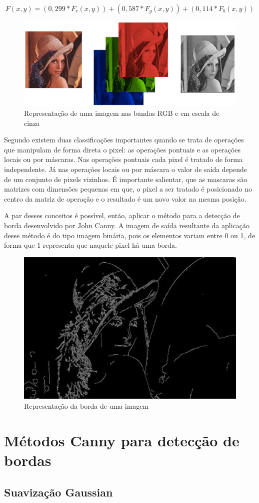 \documentclass[a4paper,alpha-refs]{RBCA_v1.0}
\begin{document}
\begin{equation}
F(x,y)=(0,299*F_r(x,y))+(0,587*F_g(x,y))+(0,114*F_b(x,y))
\end{equation} 


\begin{figure}[h!]
	\centering
	\includegraphics[width=.5\textwidth]{img/lenna_rgb_gray.jpg}
	\caption{Representação de uma imagem nas bandas RGB e em escala de cinza}
	\label{img:lenargb}
\end{figure}

Segundo \cite{de2006introduccao} existem duas classificações importantes quando se trata de operações que manipulam de forma direta o pixel: as operações pontuais e as operações locais ou por máscaras. Nas operações pontuais cada pixel é tratado de forma independente. Já nas operações locais ou por máscara o valor de saída depende de um conjunto de pixels vizinhos. É importante salientar, que as mascaras são matrizes com dimensões pequenas em que, o pixel a ser tratado é posicionado no centro da matriz de operação e o resultado é um novo valor na mesma posição.

A par desses conceitos é possível, então, aplicar o método para a detecção de borda desenvolvido por John Canny. A imagem de saída resultante da aplicação desse método é do tipo imagem binária, pois os elementos variam entre 0 ou 1, de forma que 1 representa que naquele pixel há uma borda.

\begin{figure}[h!]
	\centering
	\includegraphics[width=.3\textwidth]{img/img9.jpg}
	\caption{Representação da borda de uma imagem}
	\label{img:lenaborda}
	
\end{figure}
\section{Métodos Canny para detecção de bordas}
\subsection{Suavização Gaussian}
\end{document}
